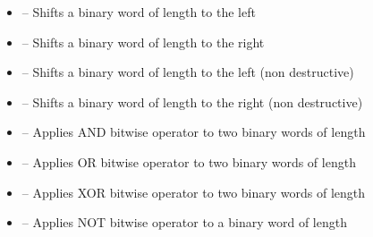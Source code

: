 \begin{itemize}
    \item \label{item:lbl-shift_left}  -- Shifts a binary word of length  to the left

		\item \label{item:lbl-shift_right}  -- Shifts a binary word of length  to the right

		\item \label{item:lbl-fill_left}  -- Shifts a binary word of length  to the left (non destructive)

		\item \label{item:lbl-fill_right}  -- Shifts a binary word of length  to the right (non destructive)

		\item \label{item:lbl-logand}  -- Applies AND bitwise operator to two binary words of length 

		\item \label{item:lbl-logor}  -- Applies OR bitwise operator to two binary words of length 

		\item \label{item:lbl-logxor}  -- Applies XOR bitwise operator to two binary words of length 

		\item \label{item:lbl-lognot}  -- Applies NOT bitwise operator to a binary word of length 
\end{itemize}

